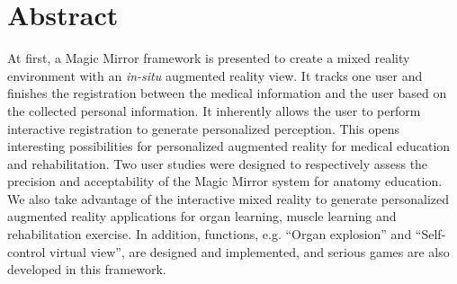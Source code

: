 %
\chapter*{Abstract}
\label{sec:abstract}

At first, a Magic Mirror framework is presented to create a mixed reality environment with an \textit{in-situ} augmented reality view. It tracks one user and finishes the registration between the medical information and the user based on the collected personal information.
It inherently allows the user to perform interactive registration to generate personalized perception. This opens interesting possibilities for personalized augmented reality for medical education and rehabilitation. Two user studies were designed to respectively assess the precision and acceptability of the Magic Mirror system for anatomy education. 
We also take advantage of the interactive mixed reality to generate personalized augmented reality applications for organ learning, muscle learning and rehabilitation exercise. In addition, functions, e.g. ``Organ explosion'' and ``Self-control virtual view'', are designed and implemented, and serious games are also developed in this framework.

